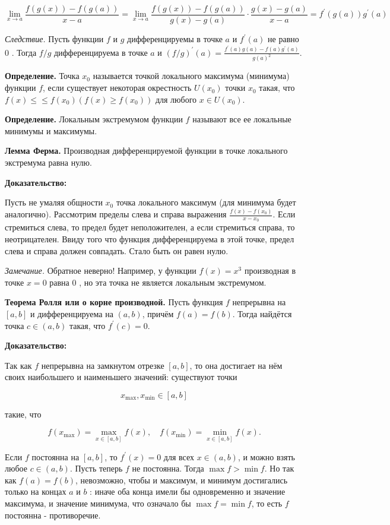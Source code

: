 $$\lim _{x \rightarrow a} \frac{f(g(x))-f(g(a))}{x-a} =\lim_{x\rightarrow a} \frac{f(g(x))-f(g(a))}{g(x)-g(a)} \cdot \frac{g(x)- g(a)}{x-a}  =f^{\prime}(g(a)) g^{\prime}(a) $$


\textit{Следствие.}
Пусть функции $f$ и $g$ дифференцируемы в точке $a$ и $f^{\prime}(a)$ не равно 0 . Тогда $f / g$ дифференцируема в точке $a$ и $(f / g)^{\prime}(a)=\frac{f^{\prime}(a) g(a)-f(a) g^{\prime}(a)}{g(a)^2}$.

\textbf{Определение.}
Точка $x_0$ называется точкой локального максимума (минимума) функции $f$, если существует некоторая окрестность $U\left(x_0\right)$ точки $x_0$ такая, что $f(x) \leqslant \leqslant f\left(x_0\right)\left(f(x) \geqslant f\left(x_0\right)\right)$ для любого $x \in U\left(x_0\right)$.

\textbf{Определение.}
Локальным экстремумом функции $f$ называют все ее локальные минимумы и максимумы.

\textbf{Лемма Ферма.}
Производная дифференцируемой функции в точке локального экстремума равна нулю.

\textbf{Доказательство:}

Пусть не умаляя общности $x_0$ точка локального максимум (для минимума будет аналогично). Рассмотрим пределы слева и справа выражения $\frac{f(x)-f\left(x_0\right)}{x-x_0}$. Если стремиться слева, то предел будет неположителен, а если стремиться справа, то неотрицателен. Ввиду того что функция дифференцируема в этой точке, предел слева и справа должен совпадать. Стало быть он равен нулю.

\textit{Замечание.} Обратное неверно! Например, у функции $f(x)=x^3$ производная в точке $x=0$ равна 0 , но эта точка не является локальным экстремумом.

\textbf{Теорема Ролля или о корне производной.}
Пусть функция $f$ непрерывна на $[a, b]$ и дифференцируема на $(a, b)$, причём $f(a)=f(b)$. Тогда найдётся точка $c \in(a, b)$ такая, что $f^{\prime}(c)=0$.

\textbf{Доказательство:}

Так как $f$ непрерывна на замкнутом отрезке $[a, b]$, то она достигает на нём своих наибольшего и наименьшего значений: существуют точки

$$
x_{\max }, x_{\min } \in[a, b]
$$


такие, что

$$
f\left(x_{\max }\right)=\max _{x \in[a, b]} f(x), \quad f\left(x_{\min }\right)=\min _{x \in[a, b]} f(x) .
$$

Если $f$ постоянна на $[a, b]$, то $f^{\prime}(x)=0$ для всех $x \in(a, b)$, и можно взять любое $c \in(a, b)$.
Пусть теперь $f$ не постоянна. Тогда $\max f>\min f$. Но так как $f(a)=f(b)$, невозможно, чтобы и максимум, и минимум достигались только на концах $a$ и $b$ : иначе оба конца имели бы одновременно и значение максимума, и значение минимума, что означало бы $\max f=\min f$, то есть $f$ постоянна - противоречие.

